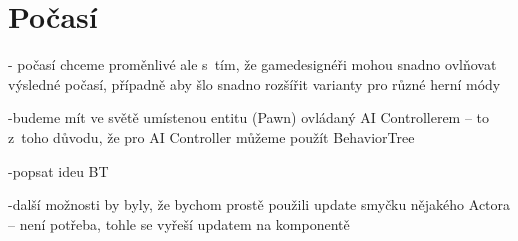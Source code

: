 
\section{Počasí}

- počasí chceme proměnlivé ale s~tím, že gamedesignéři mohou snadno ovlňovat výsledné počasí, případně aby šlo snadno rozšířit varianty pro různé herní módy

-budeme mít ve světě umístenou entitu (Pawn) ovládaný AI Controllerem -- to z~toho důvodu, že pro AI Controller můžeme použít BehaviorTree

-popsat ideu BT

-další možnosti by byly, že bychom prostě použili update smyčku nějakého Actora -- není potřeba, tohle se vyřeší updatem na komponentě